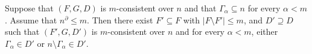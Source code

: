 Suppose that $(F, G, D)$ is $m$-consistent over $n$ and that $\Gamma_\alpha \subseteq n$ for every $\alpha < m$. Assume that $n^{\partial} \leq m$. Then there exist $F' \subseteq F$ with $|F \setminus F'| \leq m$, and $D' \supseteq D$ such that $(F', G, D')$ is $m$-consistent over $n$ and for every $\alpha < m$, either $\Gamma_\alpha \in D'$ or $n \setminus \Gamma_\alpha \in D'$.
